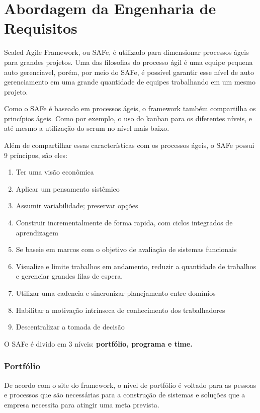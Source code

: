 \chapter{Abordagem da Engenharia de Requisitos}

  Scaled Agile Framework, ou SAFe, é utilizado para dimensionar processos ágeis para grandes projetos. Uma das filosofias do processo
  ágil é uma equipe pequena auto gerenciavel, porém, por meio do SAFe, é possível garantir esse nível de auto gerenciamento em uma
  grande quantidade de equipes trabalhando em um mesmo projeto.

  Como o SAFe é baseado em processos ágeis, o framework também compartilha os princípios ágeis. Como por exemplo, o uso do kanban para
  os diferentes níveis, e até mesmo a utilização do scrum no nível mais baixo.

  Além de compartilhar essas características com os processos ágeis, o SAFe possui 9 príncipos, são eles:

  \begin{enumerate}
    \item Ter uma visão econ\^{o}mica
    \item Aplicar um pensamento sistêmico
    \item Assumir variabilidade; preservar opções
    \item Construir incrementalmente de forma rapida, com ciclos integrados de aprendizagem
    \item Se baseie em marcos com o objetivo de avaliação de sistemas funcionais
    \item Visualize e limite trabalhos em andamento, reduzir a quantidade de trabalhos e gerenciar grandes filas de espera.
    \item Utilizar uma cadencia e sincronizar planejamento entre domínios
    \item Habilitar a motivação intrínseca de conhecimento dos trabalhadores
    \item Descentralizar a tomada de decisão
  \end{enumerate}

  O SAFe é divido em 3 níveis: \textbf{portfólio, programa e time.}

\subsection{Portfólio}

  De acordo com o site do framework, o nível de portfólio é voltado para as pessoas e processos que são necessárias para a construção
  de sistemas e soluções que a empresa necessita para atingir uma meta prevista.

